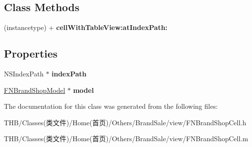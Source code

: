 \subsection*{Class Methods}
\begin{DoxyCompactItemize}
\item 
\mbox{\label{interface_f_n_brand_shop_cell_adc7bd2c618c0caad8f96a962df30d588}} 
(instancetype) + {\bfseries cell\+With\+Table\+View\+:at\+Index\+Path\+:}
\end{DoxyCompactItemize}
\subsection*{Properties}
\begin{DoxyCompactItemize}
\item 
\mbox{\label{interface_f_n_brand_shop_cell_a55de776e1eaf825c202ce814fb6598e1}} 
N\+S\+Index\+Path $\ast$ {\bfseries index\+Path}
\item 
\mbox{\label{interface_f_n_brand_shop_cell_af207cc4366833c241663314faaaf63c5}} 
\mbox{\hyperlink{interface_f_n_brand_shop_model}{F\+N\+Brand\+Shop\+Model}} $\ast$ {\bfseries model}
\end{DoxyCompactItemize}


The documentation for this class was generated from the following files\+:\begin{DoxyCompactItemize}
\item 
T\+H\+B/\+Classes(类文件)/\+Home(首页)/\+Others/\+Brand\+Sale/view/F\+N\+Brand\+Shop\+Cell.\+h\item 
T\+H\+B/\+Classes(类文件)/\+Home(首页)/\+Others/\+Brand\+Sale/view/F\+N\+Brand\+Shop\+Cell.\+m\end{DoxyCompactItemize}
